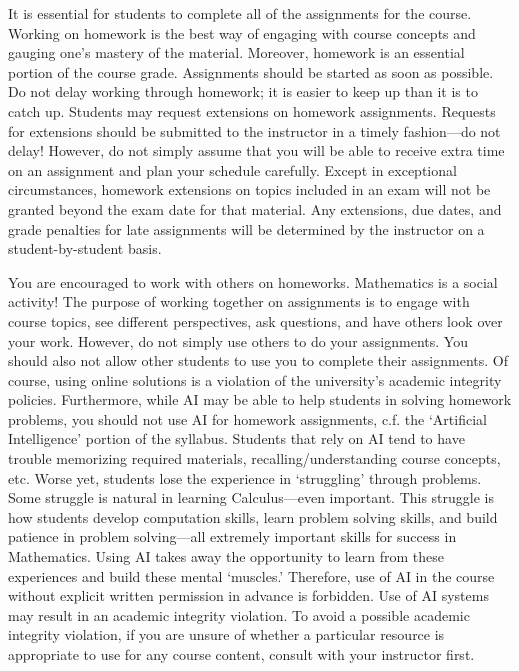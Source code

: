 \documentclass[11pt,letterpaper]{article}
\begin{document}
It is essential for students to complete all of the assignments for the course. Working on homework is the best way of engaging with course concepts and gauging one's mastery of the material. Moreover, homework is an essential portion of the course grade. Assignments should be started as soon as possible. Do not delay working through homework; it is easier to keep up than it is to catch up. Students may request extensions on homework assignments. Requests for extensions should be submitted to the instructor in a timely fashion---do not delay! However, do not simply assume that you will be able to receive extra time on an assignment and plan your schedule carefully. Except in exceptional circumstances, homework extensions on topics included in an exam will not be granted beyond the exam date for that material. Any extensions, due dates, and grade penalties for late assignments will be determined by the instructor on a student-by-student basis. \pspace

You are encouraged to work with others on homeworks. Mathematics is a social activity! The purpose of working together on assignments is to engage with course topics, see different perspectives, ask questions, and have others look over your work. However, do not simply use others to do your assignments. You should also not allow other students to use you to complete their assignments. Of course, using online solutions is a violation of the university's academic integrity policies. Furthermore, while AI may be able to help students in solving homework problems, you should not use AI for homework assignments, c.f. the `Artificial Intelligence' portion of the syllabus. Students that rely on AI tend to have trouble memorizing required materials, recalling/understanding course concepts, etc. Worse yet, students lose the experience in `struggling' through problems. Some struggle is natural in learning Calculus---even important. This struggle is how students develop computation skills, learn problem solving skills, and build patience in problem solving---all extremely important skills for success in Mathematics. Using AI takes away the opportunity to learn from these experiences and build these mental `muscles.' Therefore, use of AI in the course without explicit written permission in advance is forbidden. Use of AI systems may result in an academic integrity violation. To avoid a possible academic integrity violation, if you are unsure of whether a particular resource is appropriate to use for any course content, consult with your instructor first. \pspace
\end{document}
